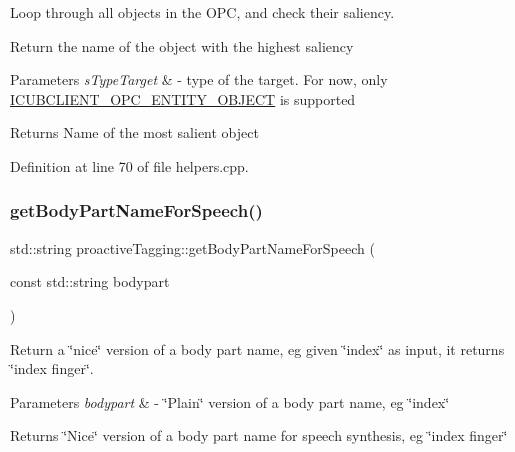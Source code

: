 Loop through all objects in the O\+PC, and check their saliency. 

Return the name of the object with the highest saliency 
\begin{DoxyParams}{Parameters}
{\em s\+Type\+Target} & -\/ type of the target. For now, only \hyperlink{group__icubclient__tags_ga6797b1b7c9fa53110a21f603348bf53b}{I\+C\+U\+B\+C\+L\+I\+E\+N\+T\+\_\+\+O\+P\+C\+\_\+\+E\+N\+T\+I\+T\+Y\+\_\+\+O\+B\+J\+E\+CT} is supported \\
\hline
\end{DoxyParams}
\begin{DoxyReturn}{Returns}
Name of the most salient object 
\end{DoxyReturn}


Definition at line 70 of file helpers.\+cpp.

\mbox{\label{classproactiveTagging_a59ee98016936f16bd5aeb4f23e10563a}} 
\subsubsection{\texorpdfstring{get\+Body\+Part\+Name\+For\+Speech()}{getBodyPartNameForSpeech()}}
{\footnotesize\ttfamily std\+::string proactive\+Tagging\+::get\+Body\+Part\+Name\+For\+Speech (\begin{DoxyParamCaption}\item[{const std\+::string}]{bodypart }\end{DoxyParamCaption})\hspace{0.3cm}{\ttfamily [protected]}}



Return a \char`\"{}nice\char`\"{} version of a body part name, eg given \char`\"{}index\char`\"{} as input, it returns \char`\"{}index finger\char`\"{}. 


\begin{DoxyParams}{Parameters}
{\em bodypart} & -\/ \char`\"{}\+Plain\char`\"{} version of a body part name, eg \char`\"{}index\char`\"{} \\
\hline
\end{DoxyParams}
\begin{DoxyReturn}{Returns}
\char`\"{}\+Nice\char`\"{} version of a body part name for speech synthesis, eg \char`\"{}index finger\char`\"{} 
\end{DoxyReturn}


